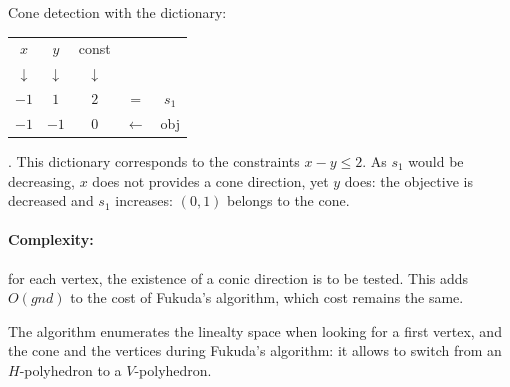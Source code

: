 \begin{example}
\begin{multicols}{2}	
	Cone detection with the dictionary:
	\begin{tabular}{| c | c || c || c c |}
	\hline	
	$x$ & $y$ & const & & \\
	$\downarrow$ & $\downarrow$ &$\downarrow$  & & \\
	\hline
	\hline		
   	$-1$ & $1$ & $2$ & = & $s_1$\\ \hline \hline	
   	$-1$ & $-1$ & $0$ & $\leftarrow$ & obj  \\
   	\hline
   	\end{tabular}. This dictionary corresponds to the constraints $x-y\leq 2$. As $s_1$ would be decreasing, $x$ does not provides a cone direction, yet $y$ does: the objective is decreased and $s_1$ increases: $(0,1)$ belongs to the cone.\\

\columnbreak

\end{multicols}
\label{ex_detec_cone}
\end{example}

\paragraph{Complexity:} for each vertex, the existence of a conic direction is to be tested. This adds $O(gnd)$ to the cost of Fukuda's algorithm, which cost remains the same.

The algorithm enumerates the linealty space when looking for a first vertex, and the cone and the vertices during Fukuda's algorithm: it allows to switch from an $H$-polyhedron to a $V$-polyhedron.



